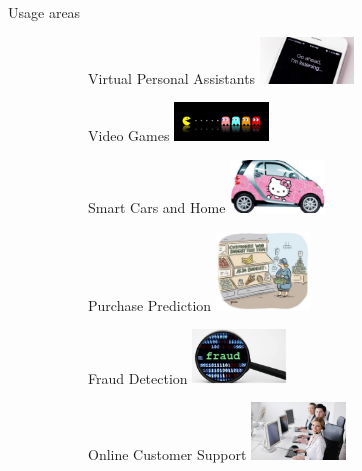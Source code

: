 \documentclass{beamer}
\begin{document}
\begin{frame}{Usage areas}
\fontsize{7pt}{5}\selectfont
\begin{figure}
\centering
\begin{subfigure}{.25\textwidth}
  \centering
  Virtual Personal Assistants
  \includegraphics[width=2.5cm]{figures/virtual-personal-assistants}
\end{subfigure}%
\begin{subfigure}{.25\textwidth}
  \centering
  Video Games
  \includegraphics[width=2.5cm]{figures/video-games}
\end{subfigure}
\begin{subfigure}{.25\textwidth}
  \centering
  Smart Cars and Home
  \includegraphics[width=2.5cm]{figures/smart-cars}
\end{subfigure}
\end{figure}
\begin{figure}
\centering
\begin{subfigure}{.25\textwidth}
  \centering
  Purchase Prediction
  \includegraphics[width=2.5cm]{figures/purchase-prediction}
\end{subfigure}%
\begin{subfigure}{.25\textwidth}
  \centering
  Fraud Detection
  \includegraphics[width=2.5cm]{figures/fraud-detection}
\end{subfigure}
\begin{subfigure}{.25\textwidth}
  \centering
  Online Customer Support
  \includegraphics[width=2.5cm]{figures/online-customer-support}

\end{subfigure}
\end{figure}
\end{frame}
\end{document}
